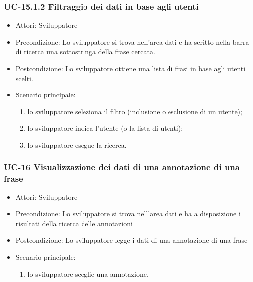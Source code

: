 	\subsubsection{UC-15.1.2 Filtraggio dei dati in base agli utenti}	
		\begin{itemize}
			\item Attori: Sviluppatore
			\item Precondizione: Lo sviluppatore si trova nell'area dati e ha scritto nella barra di ricerca una sottostringa della frase cercata.
			\item Postcondizione: Lo sviluppatore ottiene una lista di frasi in base agli utenti scelti.
			\item Scenario principale:
				\begin{enumerate}
					\item lo sviluppatore seleziona il filtro (inclusione o esclusione di un utente);
					\item lo sviluppatore indica l'utente (o la lista di utenti);
					\item lo sviluppatore esegue la ricerca.
				\end{enumerate}
		\end{itemize}	
	\subsubsection{UC-16 Visualizzazione dei dati di una annotazione di una frase}
		\begin{itemize}
			\item Attori: Sviluppatore
			\item Precondizione: Lo sviluppatore si trova nell'area dati e ha a disposizione i risultati della ricerca delle annotazioni
			\item Postcondizione: Lo sviluppatore legge i dati di una annotazione di una frase
			\item Scenario principale:
				\begin{enumerate}
					\item lo sviluppatore sceglie una annotazione.
				\end{enumerate}
		\end{itemize}
	
